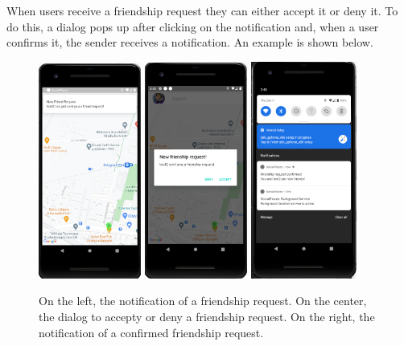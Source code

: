 \documentclass[../../main]{subfiles}
\begin{document}
\noindent
When users receive a friendship request they can either accept it or deny it. To do this, a dialog pops up after clicking on the notification and, when a user confirms it, the sender receives a notification.
An example is shown below.
\begin{figure}[H]
    \centering
    \includegraphics[width=0.3\textwidth]{images/app/notification/friend/friend_request_notification.png}
    \includegraphics[width=0.3\textwidth]{images/app/notification/friend/dialog_friend_request.png}
    \includegraphics[width=0.31\textwidth]{images/app/notification/friend/confirmed_request.png}
    \caption{On the left, the notification of a friendship request. On the center, the dialog to accepty or deny a friendship request. On the right, the notification of a confirmed friendship request.}
\end{figure}
\end{document}
